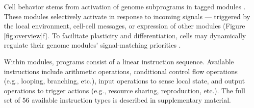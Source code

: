 Cell behavior stems from activation of genome subprograms in tagged modules \citep{lalejini2018evolving}.
These modules selectively activate in response to incoming signals \citep{moreno2023matchmaker,holland2012signals} --- triggered by the local environment, cell-cell messages, or expression of other modules (Figure \ref{fig:overview}f).
To facilitate plasticity and differentiation, cells may dynamically regulate their genome modules' signal-matching priorities \citep{lalejini2021tag}.

Within modules, programs consist of a linear instruction sequence.
Available instructions include arithmetic operations, conditional control flow operations (e.g., looping, branching, etc.), input operations to sense local state, and output operations to trigger actions (e.g., resource sharing, reproduction, etc.).
The full set of 56 available instruction types is described in supplementary material.
